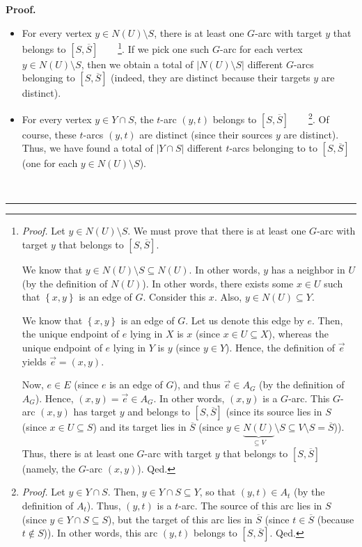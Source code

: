 \documentclass[numbers=enddot,12pt,final,onecolumn,notitlepage]{scrartcl}%
\theoremstyle{definition}
\newenvironment{proof}[1][Proof]{\noindent\textbf{#1.} }{\ \rule{0.5em}{0.5em}}
\begin{document}
\begin{proof}
\begin{itemize}
\item For every vertex $y\in N\left(  U\right)  \setminus S$, there is at
least one $G$-arc with target $y$ that belongs to $\left[  S,\overline
{S}\right]  $\ \ \ \ \footnote{\textit{Proof.} Let $y\in N\left(  U\right)
\setminus S$. We must prove that there is at least one $G$-arc with target $y$
that belongs to $\left[  S,\overline{S}\right]  $.
\par
We know that $y\in N\left(  U\right)  \setminus S\subseteq N\left(  U\right)
$. In other words, $y$ has a neighbor in $U$ (by the definition of $N\left(
U\right)  $). In other words, there exists some $x\in U$ such that $\left\{
x,y\right\}  $ is an edge of $G$. Consider this $x$. Also, $y\in N\left(
U\right)  \subseteq Y$.
\par
We know that $\left\{  x,y\right\}  $ is an edge of $G$. Let us denote this
edge by $e$. Then, the unique endpoint of $e$ lying in $X$ is $x$ (since $x\in
U\subseteq X$), whereas the unique endpoint of $e$ lying in $Y$ is $y$ (since
$y\in Y$). Hence, the definition of $\overrightarrow{e}$ yields
$\overrightarrow{e}=\left(  x,y\right)  $.
\par
Now, $e\in E$ (since $e$ is an edge of $G$), and thus $\overrightarrow{e}\in
A_{G}$ (by the definition of $A_{G}$). Hence, $\left(  x,y\right)
=\overrightarrow{e}\in A_{G}$. In other words, $\left(  x,y\right)  $ is a
$G$-arc. This $G$-arc $\left(  x,y\right)  $ has target $y$ and belongs to
$\left[  S,\overline{S}\right]  $ (since its source lies in $S$ (since $x\in
U\subseteq S$) and its target lies in $\overline{S}$ (since $y\in
\underbrace{N\left(  U\right)  }_{\subseteq V}\setminus S\subseteq V\setminus
S=\overline{S}$)). Thus, there is at least one $G$-arc with target $y$ that
belongs to $\left[  S,\overline{S}\right]  $ (namely, the $G$-arc $\left(
x,y\right)  $). Qed.}. If we pick one such $G$-arc for each vertex $y\in
N\left(  U\right)  \setminus S$, then we obtain a total of $\left\vert
N\left(  U\right)  \setminus S\right\vert $ different $G$-arcs belonging to
$\left[  S,\overline{S}\right]  $ (indeed, they are distinct because their
targets $y$ are distinct).

\item For every vertex $y\in Y\cap S$, the $t$-arc $\left(  y,t\right)  $
belongs to $\left[  S,\overline{S}\right]  $\ \ \ \ \footnote{\textit{Proof.}
Let $y\in Y\cap S$. Then, $y\in Y\cap S\subseteq Y$, so that $\left(
y,t\right)  \in A_{t}$ (by the definition of $A_{t}$). Thus, $\left(
y,t\right)  $ is a $t$-arc. The source of this arc lies in $S$ (since $y\in
Y\cap S\subseteq S$), but the target of this arc lies in $\overline{S}$ (since
$t\in\overline{S}$ (because $t\notin S$)). In other words, this arc $\left(
y,t\right)  $ belongs to $\left[  S,\overline{S}\right]  $. Qed.}. Of course,
these $t$-arcs $\left(  y,t\right)  $ are distinct (since their sources $y$
are distinct). Thus, we have found a total of $\left\vert Y\cap S\right\vert $
different $t$-arcs belonging to to $\left[  S,\overline{S}\right]  $ (one for
each $y\in N\left(  U\right)  \setminus S$).
\end{itemize}


\end{proof}
\end{document}
